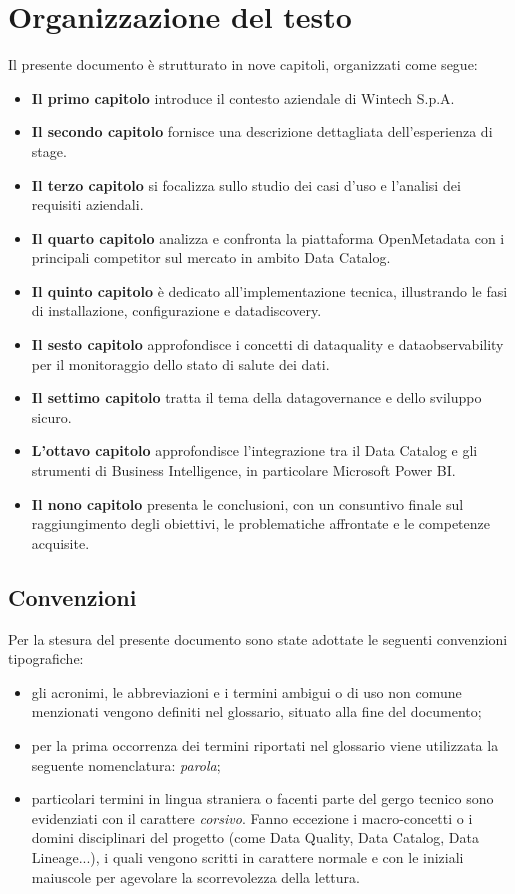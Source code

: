 \section{Organizzazione del testo}
Il presente documento è strutturato in nove capitoli, organizzati come segue:
\begin{itemize}
    \item \textbf{Il primo capitolo} introduce il contesto aziendale di Wintech S.p.A.
    \item \textbf{Il secondo capitolo} fornisce una descrizione dettagliata dell'esperienza di stage.
    \item \textbf{Il terzo capitolo} si focalizza sullo studio dei casi d'uso e l'analisi dei requisiti aziendali.
    \item \textbf{Il quarto capitolo} analizza e confronta la piattaforma OpenMetadata con i principali competitor sul mercato in ambito Data Catalog.
    \item \textbf{Il quinto capitolo} è dedicato all'implementazione tecnica, illustrando le fasi di installazione, configurazione e \gls{datadiscovery}.
    \item \textbf{Il sesto capitolo} approfondisce i concetti di \gls{dataquality} e \gls{dataobservability} per il monitoraggio dello stato di salute dei dati.
    \item \textbf{Il settimo capitolo} tratta il tema della \gls{datagovernance} e dello sviluppo sicuro.
    \item \textbf{L'ottavo capitolo} approfondisce l'integrazione tra il Data Catalog e gli strumenti di Business Intelligence, in particolare Microsoft Power BI.
    \item \textbf{Il nono capitolo} presenta le conclusioni, con un consuntivo finale sul raggiungimento degli obiettivi, le problematiche affrontate e le competenze acquisite.
\end{itemize}

\subsection{Convenzioni}
Per la stesura del presente documento sono state adottate le seguenti convenzioni tipografiche:
\begin{itemize}
	\item gli acronimi, le abbreviazioni e i termini ambigui o di uso non comune menzionati vengono definiti nel glossario, situato alla fine del documento;
	\item per la prima occorrenza dei termini riportati nel glossario viene utilizzata la seguente nomenclatura: \emph{parola}\glsfirstoccur;
	\item particolari termini in lingua straniera o facenti parte del gergo tecnico sono evidenziati con il carattere \emph{corsivo}. Fanno eccezione i macro-concetti o i domini disciplinari del progetto (come Data Quality, Data Catalog, Data Lineage...), 
    i quali vengono scritti in carattere normale e con le iniziali maiuscole per agevolare la scorrevolezza della lettura.
\end{itemize}
